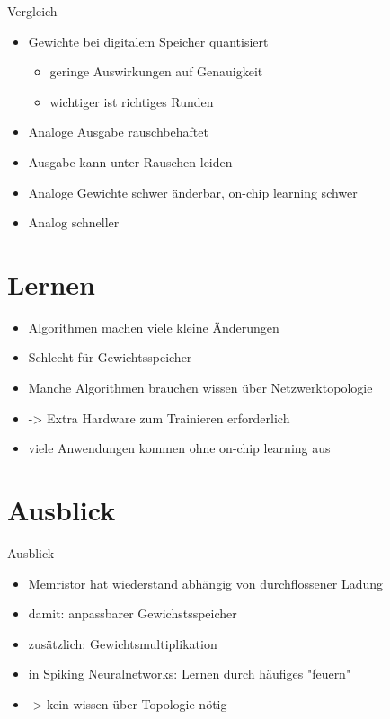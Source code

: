 \documentclass[handout]{beamer}
\begin{document}
    \begin{frame}{Vergleich}
        \begin{itemize}
            \item Gewichte bei digitalem Speicher quantisiert
            \begin{itemize}
                \item geringe Auswirkungen auf Genauigkeit
                \item wichtiger ist richtiges Runden
            \end{itemize}
            \item Analoge Ausgabe rauschbehaftet
            \item Ausgabe kann unter Rauschen leiden
            \item Analoge Gewichte schwer änderbar, on-chip learning schwer
            \item Analog schneller
        \end{itemize}
    \end{frame}

    \section{Lernen}

    \begin{frame}
        \begin{itemize}
            \item Algorithmen machen viele kleine Änderungen
            \item Schlecht für Gewichtsspeicher
            \item Manche Algorithmen brauchen wissen über Netzwerktopologie
            \item -> Extra Hardware zum Trainieren erforderlich
            \item viele Anwendungen kommen ohne on-chip learning aus
        \end{itemize}
    \end{frame}

    \section{Ausblick}

    \begin{frame}{Ausblick}
        \begin{itemize}
            \item Memristor hat wiederstand abhängig von durchflossener Ladung
            \item damit: anpassbarer Gewichstsspeicher
            \item zusätzlich: Gewichtsmultiplikation
            \item in Spiking Neuralnetworks: Lernen durch häufiges "feuern"
            \item -> kein wissen über Topologie nötig
        \end{itemize}
    \end{frame}
\end{document}
